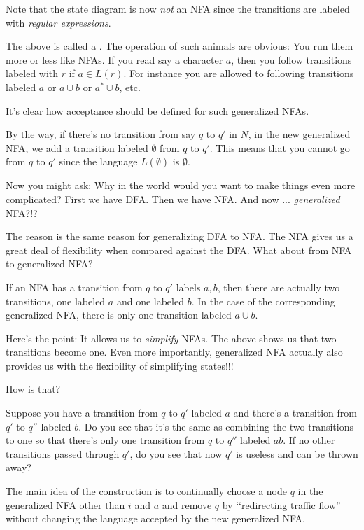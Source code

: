 Note that the state diagram is now
\textit{not} an NFA since
the transitions are labeled with \textit{regular expressions}.

The above is called a
\tinysidebarskip{}\sidebarskip{0pt}.
The operation of such animals are obvious:
You run them more or less like NFAs.
If you read say a character $a$, then you follow transitions labeled with $r$
if $a \in L(r)$.
For instance you are allowed to following transitions labeled $a$ or
$a \cup b$ or $a^* \cup b$, etc.

It's clear how acceptance should be defined for such generalized NFAs.

By the way, if there's no transition from say $q$ to $q'$ in $N$, 
in the new generalized NFA, we  
add a transition labeled $\emptyset$ from $q$ to $q'$.
This means that you cannot go from $q$ to $q'$ 
since the language $L(\emptyset)$ is $\emptyset$.

Now you might ask: Why in the world would you want to make
things even more complicated?
First we have DFA.
Then we have NFA.
And now ... \textit{generalized} NFA?!?

The reason is the same reason for generalizing DFA to NFA.
The NFA gives us a great deal of flexibility when compared against the DFA.
What about from NFA to generalized NFA?

If an NFA has a transition from $q$ to $q'$ labels $a,b$,
then there are actually two transitions, one labeled $a$ and one
labeled $b$.
In the case of the corresponding generalized NFA,
there is only one transition labeled $a \cup b$.

Here's the point: It allows us to \textit{simplify} NFAs.
The above shows us that two transitions become one.
Even more importantly, generalized NFA actually also provides us with the
flexibility of simplifying states!!!

How is that?

Suppose you have a transition from $q$ to $q'$ labeled $a$
and there's a transition from $q'$ to $q''$ labeled $b$.
Do you see that it's the same as combining the two transitions to one
so that there's only one transition from $q$ to $q''$ labeled $ab$.
If no other transitions passed through $q'$, do you see that 
now $q'$ is useless and can be thrown away?

The main idea of the construction is to continually 
choose a node $q$ in the generalized NFA other than $i$ and $a$
and remove $q$ by \lq\lq redirecting traffic flow'' 
without changing the language accepted by the new generalized NFA.

